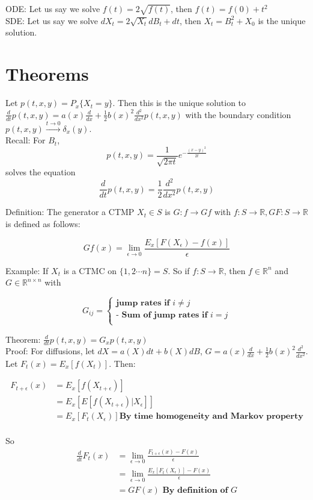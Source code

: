 \documentclass{article}
\begin{document}
ODE: Let us say we solve $f(t) = 2\sqrt{f(t)}$, then $f(t) = f(0)+t^2$ \\
SDE: Let us say we solve $dX_t = 2\sqrt{X_t}dB_t+dt$, then $X_t = B_t^2+X_0$ is the unique solution.

\section{Theorems}
Let $p(t,x,y)= P_x\{X_t=y\}$. Then this is the unique solution to $\frac{d}{dt}p(t,x,y) = a(x)\frac{d}{dx}+\frac{1}{2}b(x)^2\frac{d^2}{dx^2}p(t,x,y)$ with the boundary condition $p(t,x,y)\xrightarrow{t\to 0}\delta_x(y)$. \\

Recall: For $B_t$, \\
$$p(t,x,y) = \frac{1}{\sqrt{2\pi t}}e^{-\frac{(x-y)^2}{2t}}$$ solves the equation $$\frac{d}{dt} p(t,x,y) = \frac{1}{2}\frac{d^2}{dx^2}p(t,x,y)$$

Definition: The generator a CTMP $X_t\in S$ is $G:f\to Gf$ with $f: S\to \mathbb{R}, GF:S\to \mathbb{R}$ is defined as follows:

$$Gf(x) = \lim_{\epsilon \to 0}\frac{E_x[F(X_\epsilon)-f(x)]}{\epsilon}$$

Example: If $X_t$ is a CTMC on $\{1,2\cdots n\} = S$. So if $f: S\to \mathbb{R}$, then $f\in \mathbb{R}^n$ and $G\in \mathbb{R}^{n\times n}$ with 

$$
G_{ij}=
\begin{cases}
\textbf{jump rates if $i\neq j$}\\
\textbf{- Sum of jump rates if $i=j$}\\
\end{cases}
$$

Theorem: $\frac{d}{dt}p(t,x,y) = G_x p(t,x,y)$ \\
Proof: For diffusions, let $dX = a(X)dt+b(X)dB$, $G = a(x)\frac{d}{dx}+\frac{1}{2}b(x)^2\frac{d^2}{dx^2}$. Let $F_t(x) = E_x[f(X_t)]$. Then:

\begin{align}
    F_{t+\epsilon}(x) &= E_x[f(X_{t+\epsilon})] \\
    &= E_x[E[f(X_{t+\epsilon})|X_{\epsilon}]] \\
    &= E_x[F_t(X_\epsilon)] \textbf{By time homogeneity and Markov property} \\
\end{align} 

So
\begin{align}
    \frac{d}{dt}F_t(x) &= \lim_{\epsilon\to 0} \frac{F_{t+\epsilon}(x)-F(x)}{\epsilon} \\
    &=  \lim_{\epsilon\to 0} \frac{E_x[F_t(X_\epsilon)]-F(x)}{\epsilon} \\
    &= GF(x) \textbf{ By definition of $G$} 
\end{align}
\end{document}

